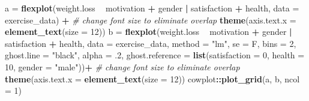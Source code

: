 \documentclass[
  man]{apa6}
\newenvironment{Shaded}{\begin{snugshade}}{\end{snugshade}}
\newcommand{\CommentTok}[1]{\textcolor[rgb]{0.56,0.35,0.01}{\textit{#1}}}
\newcommand{\DataTypeTok}[1]{\textcolor[rgb]{0.13,0.29,0.53}{#1}}
\newcommand{\DecValTok}[1]{\textcolor[rgb]{0.00,0.00,0.81}{#1}}
\newcommand{\FloatTok}[1]{\textcolor[rgb]{0.00,0.00,0.81}{#1}}
\newcommand{\KeywordTok}[1]{\textcolor[rgb]{0.13,0.29,0.53}{\textbf{#1}}}
\newcommand{\NormalTok}[1]{#1}
\newcommand{\OperatorTok}[1]{\textcolor[rgb]{0.81,0.36,0.00}{\textbf{#1}}}
\newcommand{\StringTok}[1]{\textcolor[rgb]{0.31,0.60,0.02}{#1}}
\begin{document}
\begin{Shaded}
\begin{Highlighting}[]
\NormalTok{a =}\StringTok{ }\KeywordTok{flexplot}\NormalTok{(weight.loss }\OperatorTok{~}\StringTok{ }\NormalTok{motivation }\OperatorTok{+}\StringTok{ }\NormalTok{gender }\OperatorTok{|}\StringTok{ }\NormalTok{satisfaction }\OperatorTok{+}\StringTok{ }\NormalTok{health, }
    \DataTypeTok{data =}\NormalTok{ exercise_data) }\OperatorTok{+}
\StringTok{  }\CommentTok{# change font size to eliminate overlap}
\StringTok{    }\KeywordTok{theme}\NormalTok{(}\DataTypeTok{axis.text.x =} 
            \KeywordTok{element_text}\NormalTok{(}\DataTypeTok{size =} \DecValTok{12}\NormalTok{))}
\NormalTok{b =}\StringTok{ }\KeywordTok{flexplot}\NormalTok{(weight.loss }\OperatorTok{~}\StringTok{ }\NormalTok{motivation }\OperatorTok{+}\StringTok{ }\NormalTok{gender }\OperatorTok{|}\StringTok{ }\NormalTok{satisfaction }\OperatorTok{+}\StringTok{ }\NormalTok{health, }
    \DataTypeTok{data =}\NormalTok{ exercise_data, }
    \DataTypeTok{method =} \StringTok{"lm"}\NormalTok{, }\DataTypeTok{se =}\NormalTok{ F, }\DataTypeTok{bins =} \DecValTok{2}\NormalTok{, }\DataTypeTok{ghost.line =} \StringTok{"black"}\NormalTok{, }\DataTypeTok{alpha =} \FloatTok{.2}\NormalTok{,}
    \DataTypeTok{ghost.reference =} \KeywordTok{list}\NormalTok{(}\DataTypeTok{satisfaction =} \DecValTok{0}\NormalTok{, }\DataTypeTok{health =} \DecValTok{10}\NormalTok{, }\DataTypeTok{gender =} \StringTok{"male"}\NormalTok{))}\OperatorTok{+}
\StringTok{  }\CommentTok{# change font size to eliminate overlap}
\StringTok{    }\KeywordTok{theme}\NormalTok{(}\DataTypeTok{axis.text.x =} 
            \KeywordTok{element_text}\NormalTok{(}\DataTypeTok{size =} \DecValTok{12}\NormalTok{))}
\NormalTok{cowplot}\OperatorTok{::}\KeywordTok{plot_grid}\NormalTok{(a, b, }\DataTypeTok{ncol =} \DecValTok{1}\NormalTok{)}
\end{Highlighting}
\end{Shaded}
\end{document}
